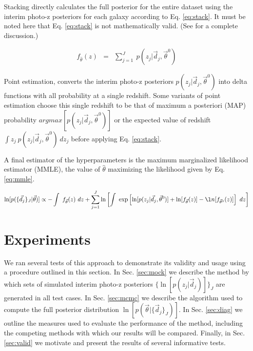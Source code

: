 \documentclass[preprint]{aastex}
\begin{document}
Stacking directly calculates the full posterior for the entire dataset using 
the interim photo-z posteriors for each galaxy according to Eq. \ref{eq:stack}. 
 \citep{Lima2008}  It must be noted here that Eq. \ref{eq:stack} is not 
mathematically valid.  (See \citet{Hogg2012} for a complete discussion.)  

\begin{eqnarray}
\label{eq:stack}
f_{\hat{\theta}}(z) &=& \sum_{j=1}^{J}\ p(z_{j}|\vec{d}_{j},\vec{\theta}^{0})
\end{eqnarray}

Point estimation, converts the interim photo-z posteriors 
$p(z_{j}|\vec{d}_{j},\vec{\theta}^{0})$ into delta functions with all 
probability at a single redshift.  Some variants of point estimation choose 
this single redshift to be that of maximum a posteriori (MAP) probability 
$argmax[p(z_{j}|\vec{d}_{j},\vec{\theta}^{0})]$ or the expected value of 
redshift $\int z_{j}\ p(z_{j}|\vec{d}_{j},\vec{\theta}^{0})\ dz_{j}$ before 
applying Eq. \ref{eq:stack}.  

A final estimator of the hyperparameters is the maximum marginalized likelihood 
estimator (MMLE), the value of $\hat{\theta}$ maximizing the likelihood given 
by Eq. \ref{eq:mmle}.

\begin{eqnarray}
\label{eq:mmle}
\ln[p(\{\vec{d}_{j}\}_{J}|\vec{\theta})] \propto -\int\ f_{\vec{\theta}}(z)\ 
dz+\sum_{j=1}^{J}\ln\left[\int\ 
\exp\left[\ln[p(z_{j}|\vec{d}_{j},\vec{\theta}^{0})]+\ln[f_{\vec{\theta}}(z)]-\l
n[f_{\vec{\theta}^{0}}(z)]\right]\ dz\right]
\end{eqnarray}

\clearpage
\section{Experiments}
\label{sec:exp}

We ran several tests of this approach to demonstrate its validity and usage 
using a procedure outlined in this section.  In Sec. \ref{sec:mock} we describe 
the method by which sets of simulated interim photo-z posteriors 
$\{\ln[p(z_{j}|\vec{d}_{j})]\}_{J}$ are generated in all test cases.  In Sec. 
\ref{sec:mcmc} we describe the algorithm used to compute the full posterior 
distribution $\ln[p(\vec{\theta}|\{\vec{d}_{j}\}_{J})]$.  In Sec. 
\ref{sec:diag} we outline the measures used to evaluate the performance of the 
method, including the competing methods with which our results will be 
compared.  Finally, in Sec. \ref{sec:valid} we motivate and present the results 
of several informative tests.
\end{document}
